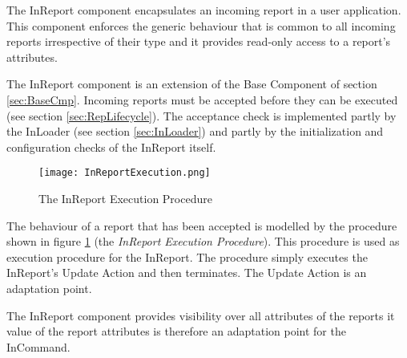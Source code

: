 The InReport component encapsulates an incoming report in a user application. This component enforces the generic behaviour that is common to all incoming reports irrespective of their type and it provides read-only access to a report's attributes.

The InReport component is an extension of the Base Component of section \ref{sec:BaseCmp}. Incoming reports must be accepted before they can be executed (see section \ref{sec:RepLifecycle}). The acceptance check is implemented partly by the InLoader (see section \ref{sec:InLoader}) and partly by the initialization and configuration checks of the InReport itself.

\begin{figure}[h]
 \centering
 \texttt{[image: InReportExecution.png]}
 \caption{The InReport Execution Procedure}
 \label{fig:InReportExecution}
\end{figure}

The behaviour of a report that has been accepted is modelled by the procedure shown in figure \ref{fig:InReportExecution} (the \textit{InReport Execution Procedure}). This procedure is used as execution procedure for the InReport. The procedure simply executes the InReport's Update Action and then terminates. The Update Action is an adaptation point.

The InReport component provides visibility over all attributes of the reports it  value of the report attributes is therefore an adaptation point for the InCommand.

